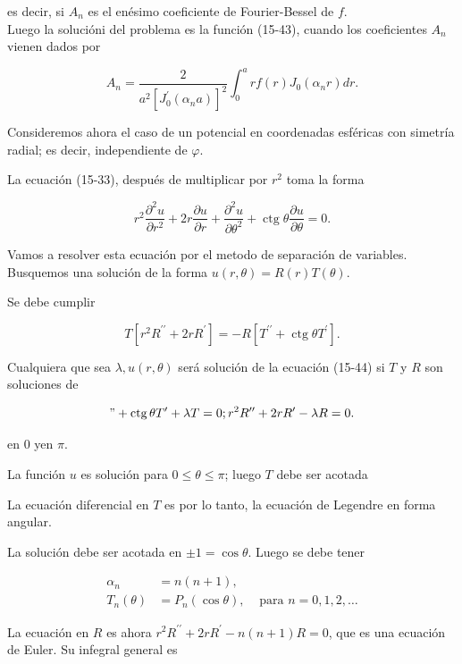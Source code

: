 \documentclass[10pt]{article}
\theoremstyle{plain}
\theoremstyle{definition}
\theoremstyle{remark}
\begin{document}
es decir, si $A_{n}$ es el enésimo coeficiente de Fourier-Bessel de $f$.\\
Luego la solucióni del problema es la función (15-43), cuando los coeficientes $A_{n}$ vienen dados por

$$
A_{n}=\frac{2}{a^{2}\left[J_{0}^{\prime}\left(\alpha_{n} a\right)\right]^{2}} \int_{0}^{a} r f(r) J_{0}\left(\alpha_{n} r\right) d r .
$$

Consideremos ahora el caso de un potencial en coordenadas esféricas con simetría radial; es decir, independiente de $\varphi$.

La ecuación (15-33), después de multiplicar por $r^{2}$ toma la forma


\begin{equation*}
r^{2} \frac{\partial^{2} u}{\partial r^{2}}+2 r \frac{\partial u}{\partial r}+\frac{\partial^{2} u}{\partial \theta^{2}}+\operatorname{ctg} \theta \frac{\partial u}{\partial \theta}=0 . \tag{15-44}
\end{equation*}


Vamos a resolver esta ecuación por el metodo de separación de variables. Busquemos una solución de la forma $u(r, \theta)=R(r) T(\theta)$.

Se debe cumplir

$$
T\left[r^{2} R^{\prime \prime}+2 r R^{\prime}\right]=-R\left[T^{\prime \prime}+\operatorname{ctg} \theta T^{\prime}\right] .
$$

Cualquiera que sea $\lambda, u(r, \theta)$ será solución de la ecuación (15-44) si $T$ y $R$ son soluciones de

$$
"+\operatorname{ctg} \theta T^{\prime}+\lambda T=0 ; r^{2} R^{\prime \prime}+2 r R^{\prime}-\lambda R=0 .
$$

en 0 yen $\pi$.

La función $u$ es solución para $0 \leqslant \theta \leqslant \pi$; luego $T$ debe ser acotada

La ecuación diferencial en $T$ es por lo tanto, la ecuación de Legendre en forma angular.

La solución debe ser acotada en $\pm 1=\cos \theta$. Luego se debe tener

$$
\begin{array}{rlr}
\alpha_{n} & =n(n+1), & \\
T_{n}(\theta) & =P_{n}(\cos \theta), & \text { para } n=0,1,2, \ldots
\end{array}
$$

La ecuación en $R$ es ahora $r^{2} R^{\prime \prime}+2 r R^{\prime}-n(n+1) R=0$, que es una ecuación de Euler. Su infegral general es
\end{document}

